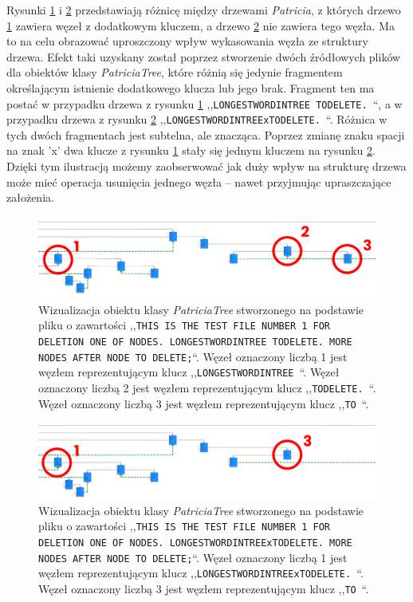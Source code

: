 		Rysunki \ref{fig:Delete1} i \ref{fig:Delete2} przedstawiają różnicę między drzewami \emph{Patricia}, z których drzewo \ref{fig:Delete1} zawiera węzeł z dodatkowym kluczem, a drzewo \ref{fig:Delete2} nie zawiera tego węzła. Ma to na celu obrazować uproszczony wpływ wykasowania węzła ze struktury drzewa. Efekt taki uzyskany został poprzez stworzenie dwóch źródłowych plików dla obiektów klasy \emph{PatriciaTree}, które różnią się jedynie fragmentem określającym istnienie dodatkowego klucza lub jego brak. Fragment ten ma postać w przypadku drzewa z rysunku \ref{fig:Delete1} ,,\texttt{LONGESTWORDINTREE TODELETE. }``, a w przypadku drzewa z rysunku \ref{fig:Delete2} ,,\texttt{LONGESTWORDINTREExTODELETE. }``. Różnica w tych dwóch fragmentach jest subtelna, ale znacząca. Poprzez zmianę znaku spacji na znak 'x' dwa klucze z rysunku \ref{fig:Delete1} stały się jednym kluczem na rysunku \ref{fig:Delete2}. Dzięki tym ilustracją możemy zaobserwować jak duży wpływ na strukturę drzewa może mieć operacja usunięcia jednego węzła -- nawet przyjmując upraszczające założenia.\newpage
    	
        \begin{figure}[htb]
    		\caption{Wizualizacja obiektu klasy \emph{PatriciaTree} stworzonego na podstawie pliku o zawartości ,,\texttt{THIS IS THE TEST FILE NUMBER 1 FOR DELETION ONE OF NODES. LONGESTWORDINTREE TODELETE. MORE NODES AFTER NODE TO DELETE;}``. Węzeł oznaczony liczbą 1 jest węzłem reprezentującym klucz ,,\texttt{LONGESTWORDINTREE }``. Węzeł oznaczony liczbą 2 jest węzłem reprezentującym klucz ,,\texttt{TODELETE. }``. Węzeł oznaczony liczbą 3 jest węzłem reprezentującym klucz ,,\texttt{TO }``.}\label{fig:Delete1}
    		\centering
    		\includegraphics[width = \textwidth]{Delete1.png}
    	\end{figure}
    	
        \begin{figure}[htb]
    		\caption{Wizualizacja obiektu klasy \emph{PatriciaTree} stworzonego na podstawie pliku o zawartości ,,\texttt{THIS IS THE TEST FILE NUMBER 1 FOR DELETION ONE OF NODES. LONGESTWORDINTREExTODELETE. MORE NODES AFTER NODE TO DELETE;}``. Węzeł oznaczony liczbą 1 jest węzłem reprezentującym klucz ,,\texttt{LONGESTWORDINTREExTODELETE. }``. Węzeł oznaczony liczbą 3 jest węzłem reprezentującym klucz ,,\texttt{TO }``.}\label{fig:Delete2}
    		\centering
    		\includegraphics[width = \textwidth]{Delete2.png}
    	\end{figure}
		
